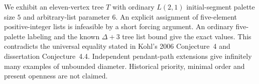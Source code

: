 
We exhibit an eleven-vertex tree \(T\) with ordinary \(L(2,1)\) initial-segment
palette size \(5\) and arbitrary-list parameter \(6\).
An explicit assignment of five-element positive-integer lists is infeasible
by a short forcing argument. An ordinary five-palette labeling and the known
\(\Delta+3\) tree list bound give the exact values.
This contradicts the universal equality stated in Kohl's 2006
Conjecture~4 and dissertation Conjecture~4.4.
Independent pendant-path extensions give infinitely many examples of
unbounded diameter. Historical priority, minimal order and present openness
are not claimed.
